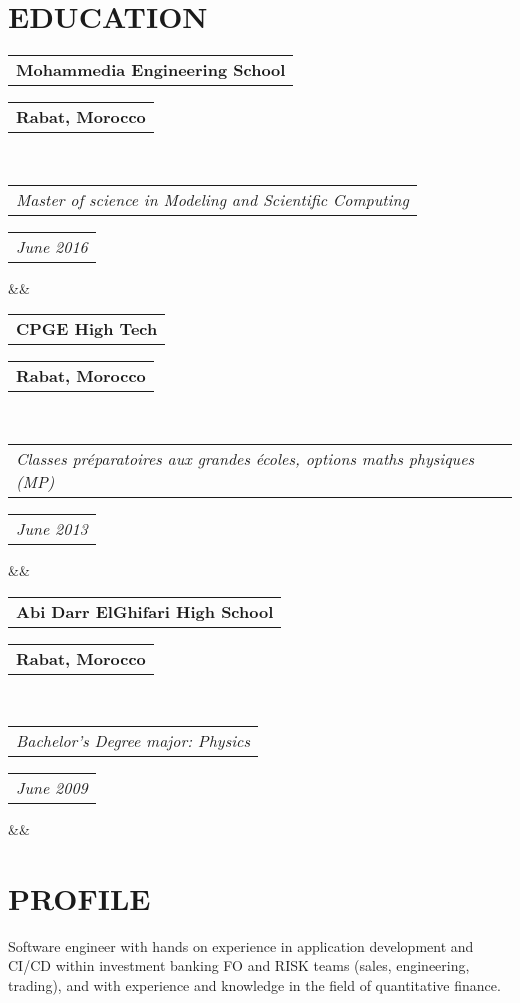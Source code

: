 \documentclass[11pt,a4paper,roman]{moderncv}        %
\makeatletter
\newcommand*{\customcventry}[7][.25em]{
  \begin{tabular}{@{}l} 
    {\bfseries #4}
  \end{tabular}
  \hfill%
  \begin{tabular}{l@{}}
     {\bfseries #5}
  \end{tabular} \\
  \begin{tabular}{@{}l} 
    {\itshape #3}
  \end{tabular}
  \hfill%
  \begin{tabular}{l@{}}
     {\itshape #2}
  \end{tabular}
  \ifx&#7&%
  \else{\\%
    \begin{minipage}{\maincolumnwidth}%
      \small#7%
    \end{minipage}}\fi%
  \par\addvspace{#1}}
\makeatother
\begin{document}
\makecvtitle
\vspace*{-23mm}

\begin{center}
\begin{tabular}{ c c c c }
\end{tabular}
\end{center}

\section{EDUCATION}
{\customcventry{June 2016}{Master of science in Modeling and Scientific Computing}{Mohammedia Engineering School}{Rabat, Morocco}{}{}}
{\customcventry{June 2013}{Classes préparatoires aux grandes écoles, options maths physiques (MP)}{CPGE High Tech}{Rabat, Morocco}{}{}}
{\customcventry{June 2009}{Bachelor's Degree major: Physics}{Abi Darr ElGhifari High School}{Rabat, Morocco}{}{}}
\section{PROFILE}
Software engineer with hands on experience in application development and CI/CD within investment banking FO and RISK teams (sales, engineering, trading), and with experience and knowledge in the field of quantitative finance.
\end{document}
